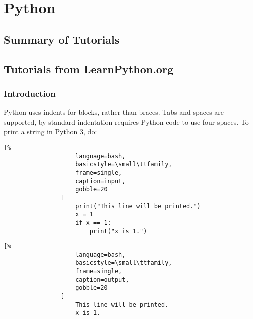 \documentclass[crop=false,class=book]{standalone}
\begin{document}
\chapter{Python}
    \section{Summary of Tutorials}
    \section{Tutorials from LearnPython.org}
        \subsection{Introduction}
            Python uses indents for blocks, rather than braces.
            Tabs and spaces are supported, by standard indentation
            requires Python code to use four spaces.
            To print a string in Python 3, do:\newline
            \begin{minipage}[t]{.48\textwidth}
                \centering
                \begin{lstlisting}[%
                    language=bash,
                    basicstyle=\small\ttfamily,
                    frame=single,
                    caption=input,
                    gobble=20
                ]
                    print("This line will be printed.")
                    x = 1
                    if x == 1:
                        print("x is 1.")
                \end{lstlisting}
            \end{minipage}\hfill
            \begin{minipage}[t]{.48\textwidth}
                \centering
                \begin{lstlisting}[%
                    language=bash,
                    basicstyle=\small\ttfamily,
                    frame=single,
                    caption=output,
                    gobble=20
                ]
                    This line will be printed.
                    x is 1.
                \end{lstlisting}
            \end{minipage}
\end{document}
